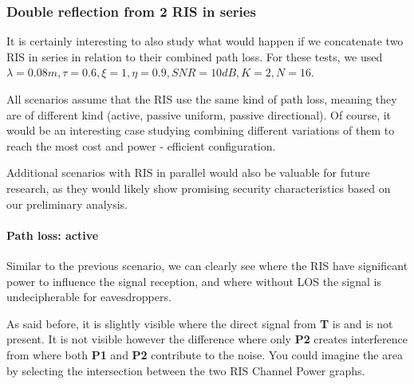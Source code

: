 \subsubsection{Double reflection from 2 RIS in series}

It is certainly interesting to also study what would happen if we concatenate two RIS in series in relation to their combined path loss. For these tests, we used $\lambda = 0.08m, \tau = 0.6, \xi = 1, \eta = 0.9, SNR = 10dB, K = 2, N = 16$.

All scenarios assume that the RIS use the same kind of path loss, meaning they are of different kind (active, passive uniform, passive directional). Of course, it would be an interesting case studying combining different variations of them to reach the most cost and power - efficient configuration.

Additional scenarios with RIS in parallel would also be valuable for future research, as they would likely show promising security characteristics based on our preliminary analysis.

\paragraph*{Path loss: active}
Similar to the previous scenario, we can clearly see where the RIS have significant power to influence the signal reception, and where without LOS the signal is undecipherable for eavesdroppers.

As said before, it is slightly visible where the direct signal from \textbf{T} is and is not present. It is not visible however the difference where only \textbf{P2} creates interference from where both \textbf{P1} and \textbf{P2} contribute to the noise. You could imagine the area by selecting the intersection between the two RIS Channel Power graphs.

